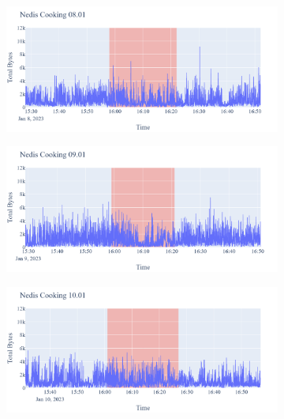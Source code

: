 \begin{figure}[H]
    \begin{subfigure}[b]{0.47\textwidth}
        \centering
        \includegraphics[width=1.2\hsize]{figures/Nedis_Cooking_Bytes_08.01.png}
    \end{subfigure}
    \begin{subfigure}[b]{0.47\textwidth}
        \centering
        \includegraphics[width=1.2\hsize]{figures/Nedis_Cooking_Bytes_09.01.png}
    \end{subfigure}
    \begin{subfigure}[b]{0.47\textwidth}
        \centering
        \includegraphics[width=1.2\hsize]{figures/Nedis_Cooking_Bytes_10.01.png}
    \end{subfigure}
    \begin{subfigure}[b]{0.47\textwidth}

\end{subfigure}
\end{figure}
